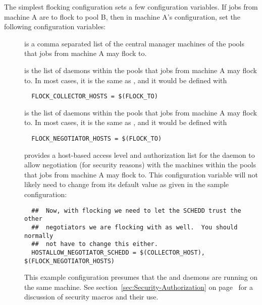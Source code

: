 The simplest flocking configuration sets
a few configuration variables.
If jobs from machine A are to flock to pool B, 
then in machine A's configuration,
set the following configuration variables:
\begin{description}
  \item[] is a comma separated list of the central
  manager machines of the pools that jobs from machine A may flock to.
  \item[]
  is the list of  daemons within the pools
  that jobs from machine A may flock to.
  In most cases, it is the same as , and
  it would be defined with 
  \begin{verbatim}
  FLOCK_COLLECTOR_HOSTS = $(FLOCK_TO)
  \end{verbatim}
  \item[]
  is the list of  daemons within the pools
  that jobs from machine A may flock to.
  In most cases, it is the same as , and
  it would be defined with 
  \begin{verbatim}
  FLOCK_NEGOTIATOR_HOSTS = $(FLOCK_TO)
  \end{verbatim}
  \item[]
  provides a host-based access level and authorization list for the
   daemon to allow negotiation (for security
  reasons) with the machines within the pools
  that jobs from machine A may flock to.
  This configuration variable will not likely need to change
  from its default value as given in the sample configuration:
  \footnotesize
  \begin{verbatim}
  ##  Now, with flocking we need to let the SCHEDD trust the other
  ##  negotiators we are flocking with as well.  You should normally
  ##  not have to change this either.
  HOSTALLOW_NEGOTIATOR_SCHEDD = $(COLLECTOR_HOST), $(FLOCK_NEGOTIATOR_HOSTS)
  \end{verbatim}
  \normalsize
  This example configuration presumes that the 
  and  daemons are running on the same machine.
  See 
  section~\ref{sec:Security-Authorization} on
  page~\pageref{sec:Security-Authorization} for a discussion
  of security macros and their use.
\end{description}


